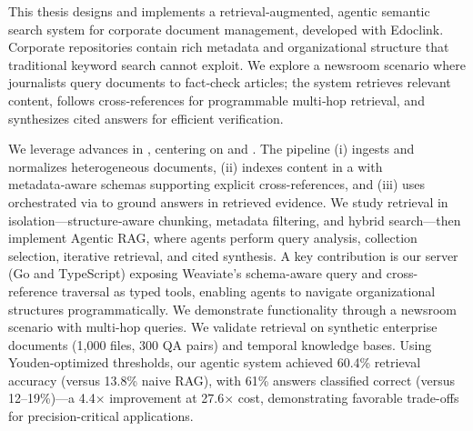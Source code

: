 \glsresetall
\noindent  
This thesis designs and implements a retrieval‑augmented, agentic semantic search system for corporate document management, developed with Edoclink. Corporate repositories contain rich metadata and organizational structure that traditional keyword search cannot exploit. We explore a newsroom scenario where journalists query documents to fact‑check articles; the system retrieves relevant content, follows cross‑references for programmable multi‑hop retrieval, and synthesizes cited answers for efficient verification.

We leverage advances in , centering on  and . The pipeline (i) ingests and normalizes heterogeneous documents, (ii) indexes content in a  with metadata‑aware schemas supporting explicit cross-references, and (iii) uses  orchestrated via  to ground answers in retrieved evidence. We study retrieval in isolation—structure‑aware chunking, metadata filtering, and hybrid search—then implement Agentic RAG, where agents perform query analysis, collection selection, iterative retrieval, and cited synthesis.
A key contribution is our  server (Go and TypeScript) exposing Weaviate's schema-aware query and cross-reference traversal as typed tools, enabling agents to navigate organizational structures programmatically. We demonstrate functionality through a newsroom scenario with multi-hop queries. We validate retrieval on synthetic enterprise documents (1,000 files, 300 QA pairs) and temporal knowledge bases. Using Youden-optimized thresholds, our agentic system achieved 60.4\% retrieval accuracy (versus 13.8\% naive RAG), with 61\% answers classified correct (versus 12–19\%)—a 4.4× improvement at 27.6× cost, demonstrating favorable trade-offs for precision-critical applications.